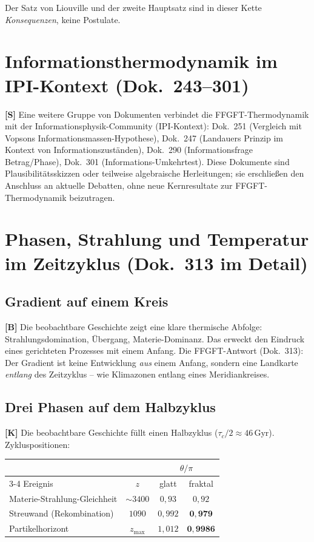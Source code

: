 Der Satz von Liouville und der zweite Hauptsatz sind in dieser
Kette \emph{Konsequenzen}, keine Postulate.

\section{Informationsthermodynamik im IPI-Kontext (Dok.~243--301)}

\textbf{[S]} Eine weitere Gruppe von Dokumenten verbindet die
FFGFT-Thermodynamik mit der Informationsphysik-Community (IPI-Kontext):
Dok.~251 (Vergleich mit Vopsons Informationsmassen-Hypothese),
Dok.~247 (Landauers Prinzip im Kontext von Informationszuständen),
Dok.~290 (Informationsfrage Betrag/Phase),
Dok.~301 (Informations-Umkehrtest).
Diese Dokumente sind Plausibilitätsskizzen oder teilweise algebraische
Herleitungen; sie erschließen den Anschluss an aktuelle Debatten,
ohne neue Kernresultate zur FFGFT-Thermodynamik beizutragen.

\section{Phasen, Strahlung und Temperatur im Zeitzyklus (Dok.~313 im Detail)}

\subsection{Gradient auf einem Kreis}

\textbf{[B]} Die beobachtbare Geschichte zeigt eine klare thermische
Abfolge: Strahlungsdomination, Übergang, Materie-Dominanz. Das
erweckt den Eindruck eines gerichteten Prozesses mit einem Anfang.
Die FFGFT-Antwort (Dok.~313): Der Gradient ist keine Entwicklung
\emph{aus} einem Anfang, sondern eine Landkarte \emph{entlang} des
Zeitzyklus – wie Klimazonen entlang eines Meridiankreises.

\subsection{Drei Phasen auf dem Halbzyklus}

\textbf{[K]} Die beobachtbare Geschichte füllt einen Halbzyklus
($\tau_c/2 \approx 46$\,Gyr). Zykluspositionen:

\begin{center}
	\small
	\begin{tabular}{lccc}
		\toprule
		& & \multicolumn{2}{c}{$\theta/\pi$} \\
		\cmidrule(l){3-4}
		Ereignis & $z$ & glatt & fraktal \\
		\midrule
		Materie-Strahlung-Gleichheit & $\sim\!3400$ & $0{,}93$ & $0{,}92$ \\
		Streuwand (Rekombination) & $1090$ & $0{,}992$ & $\mathbf{0{,}979}$ \\
		Partikelhorizont & $z_\text{max}$ & $1{,}012$ & $\mathbf{0{,}9986}$ \\
		\bottomrule
	\end{tabular}
\end{center}

